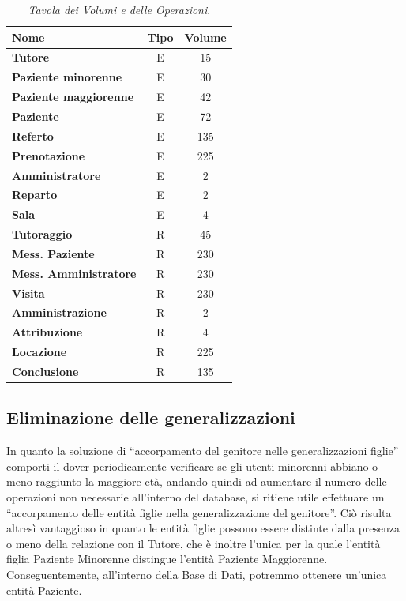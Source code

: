 \begin{table}[!t]
\begin{tabular}{lcc}
\toprule
Nome & Tipo & Volume \\
\midrule
\textbf{Tutore} & E & 15\\
\textbf{Paziente minorenne} & E & 30\\
\textbf{Paziente maggiorenne} & E & 42\\
\textbf{Paziente} & E & 72\\
\textbf{Referto} & E & 135\\
\textbf{Prenotazione} & E & 225\\
\textbf{Amministratore} & E & 2\\
\textbf{Reparto} & E & 2\\
\textbf{Sala} & E & 4\\
\textbf{Tutoraggio} & R & 45\\
\textbf{Mess. Paziente} & R & 230\\
\textbf{Mess. Amministratore} & R & 230\\
\textbf{Visita} & R & 230\\
\textbf{Amministrazione} & R & 2\\
\textbf{Attribuzione} & R & 4\\
\textbf{Locazione} & R & 225\\
\textbf{Conclusione} & R & 135\\
\end{tabular}
\caption{\textit{Tavola dei Volumi e delle Operazioni}.}
\label{tab:tdvedo}
\end{table}

\subsection{Eliminazione delle generalizzazioni}
In quanto la soluzione di ``accorpamento del genitore nelle generalizzazioni
figlie'' comporti il dover periodicamente verificare se gli utenti minorenni 
abbiano o meno raggiunto la maggiore età, andando quindi ad aumentare il numero
delle operazioni non necessarie all'interno del database, si ritiene utile
effettuare un ``accorpamento delle entità figlie nella generalizzazione del
genitore''. Ciò risulta altresì vantaggioso in quanto le entità figlie possono
essere distinte dalla presenza o meno della relazione con il Tutore, che è inoltre
l'unica per la quale l'entità figlia Paziente Minorenne distingue l'entità 
Paziente Maggiorenne. Conseguentemente, all'interno della Base di Dati, potremmo
ottenere un'unica entità Paziente. 


